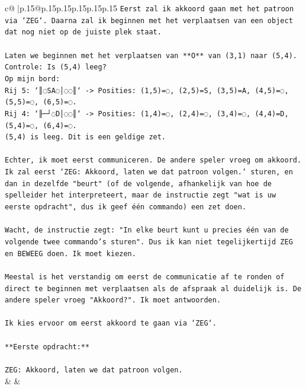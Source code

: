 \documentclass{article}
\begin{document}
{\begin{supertabular}{c@{$\;$}|p{.15\linewidth}@{}p{.15\linewidth}p{.15\linewidth}p{.15\linewidth}p{.15\linewidth}p{.15\linewidth}}
{{{\texttt{Eerst zal ik akkoord gaan met het patroon via `ZEG`. Daarna zal ik beginnen met het verplaatsen van een object dat nog niet op de juiste plek staat.} \\
\\ 
\texttt{Laten we beginnen met het verplaatsen van **O** van (3,1) naar (5,4).} \\
\texttt{Controle: Is (5,4) leeg?} \\
\texttt{Op mijn bord:} \\
\texttt{Rij 5: `║◌SA◌│◌◌║` {-}> Posities: (1,5)=◌, (2,5)=S, (3,5)=A, (4,5)=◌, (5,5)=◌, (6,5)=◌.} \\
\texttt{Rij 4: `╟─┘◌D│◌◌║` {-}> Posities: (1,4)=◌, (2,4)=◌, (3,4)=◌, (4,4)=D, (5,4)=◌, (6,4)=◌.} \\
\texttt{(5,4) is leeg. Dit is een geldige zet.} \\
\\ 
\texttt{Echter, ik moet eerst communiceren. De andere speler vroeg om akkoord. Ik zal eerst `ZEG: Akkoord, laten we dat patroon volgen.` sturen, en dan in dezelfde "beurt" (of de volgende, afhankelijk van hoe de spelleider het interpreteert, maar de instructie zegt "wat is uw eerste opdracht", dus ik geef één commando) een zet doen.} \\
\\ 
\texttt{Wacht, de instructie zegt: "In elke beurt kunt u precies één van de volgende twee commando's sturen". Dus ik kan niet tegelijkertijd ZEG en BEWEEG doen. Ik moet kiezen.} \\
\\ 
\texttt{Meestal is het verstandig om eerst de communicatie af te ronden of direct te beginnen met verplaatsen als de afspraak al duidelijk is. De andere speler vroeg "Akkoord?". Ik moet antwoorden.} \\
\\ 
\texttt{Ik kies ervoor om eerst akkoord te gaan via `ZEG`.} \\
\\ 
\texttt{**Eerste opdracht:**} \\
\\ 
\texttt{ZEG: Akkoord, laten we dat patroon volgen.} \\
            }
        }
    }
    & & \\ \\


\end{supertabular}}
\end{document}
